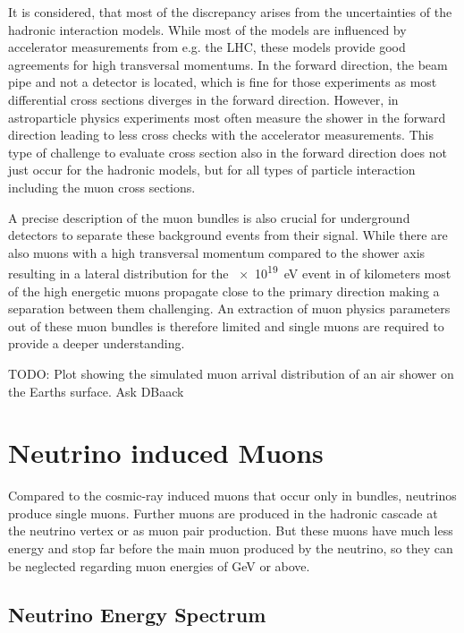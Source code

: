 It is considered, that most of the discrepancy arises from the uncertainties of the hadronic interaction models.
While most of the models are influenced by accelerator measurements from e.g. the LHC, these models provide good agreements for high transversal momentums.
In the forward direction, the beam pipe and not a detector is located, which is fine for those experiments as most differential cross sections diverges in the forward direction.
However, in astroparticle physics experiments most often measure the shower in the forward direction leading to less cross checks with the accelerator measurements.
This type of challenge to evaluate cross section also in the forward direction does not just occur for the hadronic models, but for all types of particle interaction including the muon cross sections.

A precise description of the muon bundles is also crucial for underground detectors to separate these background events from their signal.
While there are also muons with a high transversal momentum compared to the shower axis resulting in a lateral distribution for the \SI{e19}{eV} event in  of kilometers \cite{Engel11EAS} most of the high energetic muons propagate close to the primary direction making a separation between them challenging.
An extraction of muon physics parameters out of these muon bundles is therefore limited and single muons are required to provide a deeper understanding.

TODO: Plot showing the simulated muon arrival distribution of an air shower on the Earths surface. Ask DBaack

%
% 
%
%

\section{Neutrino induced Muons}

Compared to the cosmic-ray induced muons that occur only in bundles, neutrinos produce single muons.
Further muons are produced in the hadronic cascade at the neutrino vertex or as muon pair production.
But these muons have much less energy and stop far before the main muon produced by the neutrino, so they can be neglected regarding muon energies of GeV or above.

\subsection{Neutrino Energy Spectrum}

